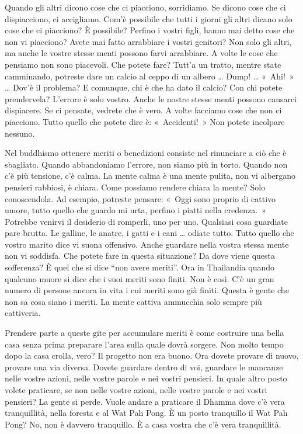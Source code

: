 Quando gli altri dicono cose che ci piacciono, sorridiamo. Se dicono
cose che ci dispiacciono, ci accigliamo. Com'è possibile che tutti i
giorni gli altri dicano solo cose che ci piacciono? È possibile? Perfino
i vostri figli, hanno mai detto cose che non vi piacciono? Avete mai
fatto arrabbiare i vostri genitori? Non solo gli altri, ma anche le
vostre stesse menti possono farvi arrabbiare. A volte le cose che
pensiamo non sono piacevoli. Che potete fare? Tutt'a un tratto, mentre
state camminando, potreste dare un calcio al ceppo di un albero \ldots{}
Dump! \ldots{} «~Ahi!~» \ldots{} Dov'è il problema? E comunque, chi è che ha dato
il calcio? Con chi potete prendervela? L'errore è solo vostro. Anche le
nostre stesse menti possono causarci dispiacere. Se ci pensate, vedrete
che è vero. A volte facciamo cose che non ci piacciono. Tutto quello che
potete dire è: «~Accidenti!~» Non potete incolpare nessuno.

Nel buddhismo ottenere meriti o benedizioni consiste nel rinunciare a
ciò che è sbagliato. Quando abbandoniamo l'errore, non siamo più in
torto. Quando non c'è più tensione, c'è calma. La mente calma è una
mente pulita, non vi albergano pensieri rabbiosi, è chiara. Come
possiamo rendere chiara la mente? Solo conoscendola. Ad esempio,
potreste pensare: «~Oggi sono proprio di cattivo umore, tutto quello che
guardo mi urta, perfino i piatti nella credenza.~» Potrebbe venirvi il
desiderio di romperli, uno per uno. Qualsiasi cosa guardiate pare
brutta. Le galline, le anatre, i gatti e i cani \ldots{} odiate tutto. Tutto
quello che vostro marito dice vi suona offensivo. Anche guardare nella
vostra stessa mente non vi soddisfa. Che potete fare in questa
situazione? Da dove viene questa sofferenza? È quel che si dice ``non
avere meriti''. Ora in Thailandia quando qualcuno muore si dice che i
suoi meriti sono finiti. Non è così. C'è un gran numero di persone
ancora in vita i cui meriti sono già finiti. Questa è gente che non sa
cosa siano i meriti. La mente cattiva ammucchia solo sempre più
cattiveria.

Prendere parte a queste gite per accumulare meriti è come costruire una
bella casa senza prima preparare l'area sulla quale dovrà sorgere. Non
molto tempo dopo la casa crolla, vero? Il progetto non era buono. Ora
dovete provare di nuovo, provare una via diversa. Dovete guardare dentro
di voi, guardare le mancanze nelle vostre azioni, nelle vostre parole e
nei vostri pensieri. In quale altro posto volete praticare, se non nelle
vostre azioni, nelle vostre parole e nei vostri pensieri? La gente si
perde. Vuole andare a praticare il Dhamma dove c'è vera tranquillità,
nella foresta e al Wat Pah Pong. È un posto tranquillo il Wat Pah Pong?
No, non è davvero tranquillo. È a casa vostra che c'è vera tranquillità.

